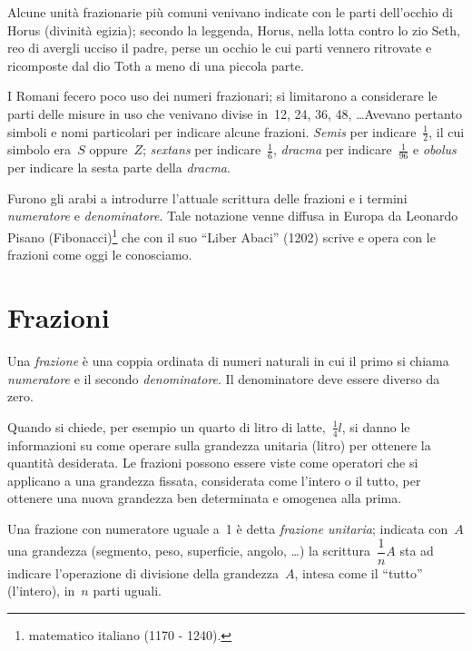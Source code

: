 Alcune unità frazionarie più comuni venivano indicate con le parti dell'occhio di Horus (divinità egizia); secondo la
leggenda, Horus, nella lotta contro lo zio Seth, reo di avergli ucciso il padre,
perse un occhio le cui parti vennero ritrovate e ricomposte dal dio Toth a meno di una piccola parte.

I Romani fecero poco uso dei numeri frazionari; si limitarono a considerare
le parti delle misure in uso che venivano divise in~12, 24, 36, 48, \ldots Avevano
pertanto simboli e nomi particolari per indicare alcune frazioni. \emph{Semis} per
indicare~$\frac{1}{2}$, il cui simbolo era~$S$ oppure~$Z$; \emph{sextans} per indicare~$\frac{1}{6}$, \emph{dracma} per
indicare~$\frac{1}{96}$ e \emph{obolus} per indicare la sesta parte della \emph{dracma}.

Furono gli arabi a introdurre l'attuale scrittura delle
frazioni e i termini \emph{numeratore} e \emph{denominatore}. Tale notazione venne diffusa in Europa
da Leonardo Pisano (Fibonacci)\footnote{matematico italiano (1170 - 1240).} che con il suo ``Liber Abaci'' (1202) scrive e
opera con le frazioni come oggi le conosciamo.

\section{Frazioni}

\begin{definizione}
Una \emph{frazione} è una coppia ordinata di numeri naturali in cui il primo si chiama \emph{numeratore}
e il secondo \emph{denominatore}. Il denominatore deve essere diverso da zero.
\end{definizione}

\begin{center}
 
\end{center}

Quando si chiede, per esempio un quarto di litro di latte,~$\frac{1}{4}\unit{l}$, si danno le informazioni
su come operare sulla grandezza unitaria (litro) per ottenere la quantità desiderata.
Le frazioni possono essere viste come operatori che si applicano a una grandezza fissata, considerata come
l'intero o il tutto, per ottenere una nuova grandezza ben determinata e omogenea alla prima.

Una frazione con numeratore uguale a~1 è detta \emph{frazione unitaria}; indicata con~$A$ una grandezza (segmento, peso,
superficie, angolo, \ldots) la scrittura~$\dfrac{1}{n}A$ sta ad indicare l'operazione di divisione della grandezza~$A$,
intesa come il ``tutto'' (l'intero), in~$n$ parti uguali.

